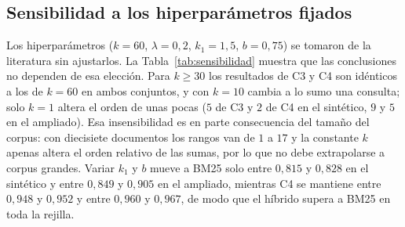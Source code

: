 \documentclass[11pt,letterpaper]{article}
\numberwithin{equation}{section}
\begin{document}
\subsection{Sensibilidad a los hiperparámetros fijados}
\label{sec:res-sensibilidad}
Los hiperparámetros ($k=60$, $\lambda=0{,}2$, $k_1=1{,}5$, $b=0{,}75$) se tomaron de la literatura sin ajustarlos. La Tabla~\ref{tab:sensibilidad} muestra que las conclusiones no dependen de esa elección. Para $k\ge 30$ los resultados de C3 y C4 son idénticos a los de $k=60$ en ambos conjuntos, y con $k=10$ cambia a lo sumo una consulta; solo $k=1$ altera el orden de unas pocas ($5$ de C3 y $2$ de C4 en el sintético, $9$ y $5$ en el ampliado). Esa insensibilidad es en parte consecuencia del tamaño del corpus: con diecisiete documentos los rangos van de $1$ a $17$ y la constante $k$ apenas altera el orden relativo de las sumas, por lo que no debe extrapolarse a corpus grandes. Variar $k_1$ y $b$ mueve a BM25 solo entre $0{,}815$ y $0{,}828$ en el sintético y entre $0{,}849$ y $0{,}905$ en el ampliado, mientras C4 se mantiene entre $0{,}948$ y $0{,}952$ y entre $0{,}960$ y $0{,}967$, de modo que el híbrido supera a BM25 en toda la rejilla.
\end{document}
